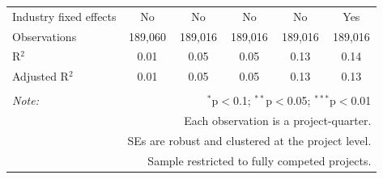 \documentclass[
]{article}
\begin{document}
\begin{table}[H]
\begin{tabular}{@{\extracolsep{-2pt}}lccccc}
Industry fixed effects & No & No & No & No & Yes \\ 
Observations & 189,060 & 189,016 & 189,016 & 189,016 & 189,016 \\ 
R$^{2}$ & 0.01 & 0.05 & 0.05 & 0.13 & 0.14 \\ 
Adjusted R$^{2}$ & 0.01 & 0.05 & 0.05 & 0.13 & 0.13 \\ 
\hline 
\hline \\[-1.8ex] 
\textit{Note:}  & \multicolumn{5}{r}{$^{*}$p$<$0.1; $^{**}$p$<$0.05; $^{***}$p$<$0.01} \\ 
 & \multicolumn{5}{r}{Each observation is a project-quarter.} \\ 
 & \multicolumn{5}{r}{SEs are robust and clustered at the project level.} \\ 
 & \multicolumn{5}{r}{Sample restricted to fully competed projects.} \\ 
\end{tabular} 
\end{table}
\end{document}
